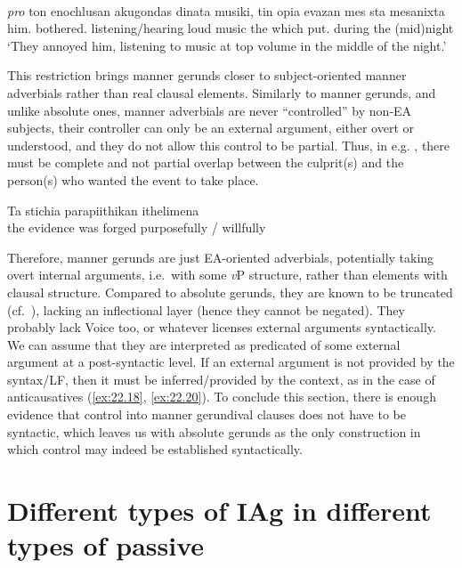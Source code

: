 \documentclass[output=paper]{langsci/langscibook}
\begin{document}
\ea%
    \label{ex:22.25} \\
    \gll    \emph{pro} ton     enochlusan   akugondas dinata musiki, tin     opia   evazan     mes     sta    mesanixta\\
            {} him.\Cl{}  bothered.\Tpl{}  listening/hearing  loud     music the which   put.\Tpl{}  during   the  (mid)night\\
    \glt    \enquote*{They annoyed him, listening to music at top volume in the middle of the night.}
\z

This restriction brings manner gerunds closer to subject-oriented manner
adverbials rather than real clausal elements. Similarly to manner gerunds, and
unlike absolute ones, manner adverbials are never “controlled” by non-\gls{EA}
subjects, their controller can only be an external argument, either overt or
understood, and they do not allow this control to be partial.  Thus, in e.g.
, there must be complete and not partial overlap between the
culprit(s) and the person(s) who wanted the event to take place.

\ea%
    \label{ex:22.26}
    \gll    Ta      stichia    parapiithikan ithelimena\\
            the evidence  {was forged} {purposefully / willfully}\\
\z

Therefore, manner gerunds are just \gls{EA}-oriented adverbials, potentially
taking overt internal arguments, i.e.\ with some \emph{v}P structure, rather
than elements with clausal structure. Compared to absolute gerunds, they are
known to be truncated (cf.\ \citealt{Tsimpli2000}), lacking an inflectional
layer (hence they cannot be negated). They probably lack Voice too, or whatever
licenses external arguments syntactically. We can assume that they are
interpreted as predicated of some external argument at a post-syntactic level.
If an external argument is not provided by the syntax/LF, then it must be
inferred/provided by the context, as in the case of anticausatives (\ref{ex:22.18}, \ref{ex:22.20}). To
conclude this section, there is enough evidence that control into manner
gerundival clauses does not have to be syntactic, which leaves us with absolute
gerunds as the only construction in which control may indeed be established
syntactically.

\section{Different types of \gls{IAg} in different types of
passive}\label{sec:22.4}
\end{document}
